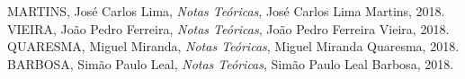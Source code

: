 \documentclass{article}
\begin{document}
\newpage

\begin{thebibliography}{10}
    MARTINS, José Carlos Lima,
    \textit{Notas Teóricas},
    José Carlos Lima Martins, 
    2018.
    VIEIRA, João Pedro Ferreira,
    \textit{Notas Teóricas},
    João Pedro Ferreira Vieira, 
    2018.
    QUARESMA, Miguel Miranda,
    \textit{Notas Teóricas},
    Miguel Miranda Quaresma, 
    2018.
    BARBOSA, Simão Paulo Leal,
    \textit{Notas Teóricas},
    Simão Paulo Leal Barbosa, 
    2018. 
\end{thebibliography}
\end{document}
